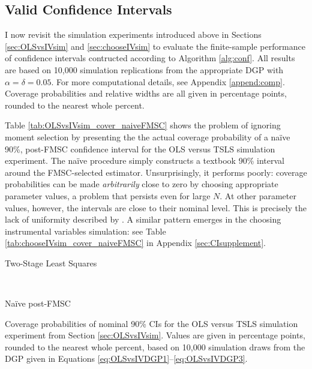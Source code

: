 \subsection{Valid Confidence Intervals}
\label{sec:CIsim}
I now revisit the simulation experiments introduced above in Sections \ref{sec:OLSvsIVsim} and \ref{sec:chooseIVsim} to evaluate the finite-sample performance of confidence intervals contructed according to Algorithm \ref{alg:conf}.
All results are based on 10,000 simulation replications from the appropriate DGP with $\alpha = \delta = 0.05$.
For more computational details, see Appendix \ref{append:comp}.
Coverage probabilities and relative widths are all given in percentage points, rounded to the nearest whole percent.

Table \ref{tab:OLSvsIVsim_cover_naiveFMSC} shows the problem of ignoring moment selection by presenting the the actual coverage probability of a na\"{i}ve 90\%, post-FMSC confidence interval for the OLS versus TSLS simulation experiment.
The na\"{i}ve procedure simply constructs a textbook 90\% interval around the FMSC-selected estimator.
Unsurprisingly, it performs poorly: coverage probabilities can be made \emph{arbitrarily} close to zero by choosing appropriate parameter values, a problem that persists even for large $N$.
At other parameter values, however, the intervals are close to their nominal level.
This is precisely the lack of uniformity described by \cite{LeebPoetscher2005}.
A similar pattern emerges in the choosing instrumental variables simulation: see Table \ref{tab:chooseIVsim_cover_naiveFMSC} in Appendix \ref{sec:CIsupplement}.

\begin{table}[h]
\footnotesize
\centering
	\begin{subtable}{0.48\textwidth}
		\caption{Two-Stage Least Squares}
		
		\label{tab:OLSvsIVsim_cover_TSLS}
	\end{subtable}	
	~
	\begin{subtable}{0.48\textwidth}
		\caption{Na\"{i}ve post-FMSC}
		
		\label{tab:OLSvsIVsim_cover_naiveFMSC}
	\end{subtable}
	\caption{Coverage probabilities of nominal 90\% CIs for the OLS versus TSLS simulation experiment from Section \ref{sec:OLSvsIVsim}. Values are given in percentage points, rounded to the nearest whole percent, based on 10,000 simulation draws from the DGP given in Equations \ref{eq:OLSvsIVDGP1}--\ref{eq:OLSvsIVDGP3}.}
\end{table}


